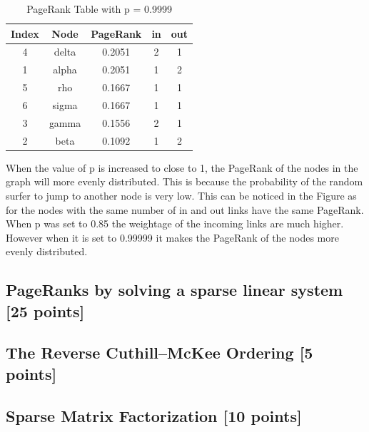 \documentclass[unicode,11pt,a4paper,oneside,numbers=endperiod,openany]{scrartcl}
\begin{document}
\noindent
\begin{table}[H]
    \centering
    \begin{tabular}{|c|c|c|c|c|}
        \hline
        Index & Node  & PageRank & in & out \\
        \hline
        4     & delta & 0.2051   & 2  & 1   \\
        \hline
        1     & alpha & 0.2051   & 1  & 2   \\
        \hline
        5     & rho   & 0.1667   & 1  & 1   \\
        \hline
        6     & sigma & 0.1667   & 1  & 1   \\
        \hline
        3     & gamma & 0.1556   & 2  & 1   \\
        \hline
        2     & beta  & 0.1092   & 1  & 2   \\
        \hline
    \end{tabular}
    \caption{PageRank Table with p = 0.9999}
    \label{tab:pagerank-table-85}
\end{table}



When the value of p is increased to close to 1, the PageRank of the nodes in the graph will more evenly distributed. This is because the probability of the random surfer to jump to another node is very low. This can be noticed in the Figure  as for the nodes with the same number of in and out links have the same PageRank. When p was set to 0.85 the weightage of the incoming links are much higher. However when it is set to 0.99999 it makes the PageRank of the nodes more evenly distributed. \\

\subsection{PageRanks by solving a sparse linear system [25 points]}

\subsection{The Reverse Cuthill--McKee Ordering [5 points]}

\subsection{Sparse Matrix Factorization [10 points]}
\end{document}
